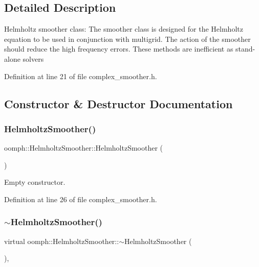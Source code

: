 \subsection{Detailed Description}
Helmholtz smoother class\+: The smoother class is designed for the Helmholtz equation to be used in conjunction with multigrid. The action of the smoother should reduce the high frequency errors. These methods are inefficient as stand-\/alone solvers 

Definition at line 21 of file complex\+\_\+smoother.\+h.



\subsection{Constructor \& Destructor Documentation}
\mbox{\label{classoomph_1_1HelmholtzSmoother_a7d220faf3d4834550ed0bc42f077c303}} 
\subsubsection{\texorpdfstring{Helmholtz\+Smoother()}{HelmholtzSmoother()}}
{\footnotesize\ttfamily oomph\+::\+Helmholtz\+Smoother\+::\+Helmholtz\+Smoother (\begin{DoxyParamCaption}{ }\end{DoxyParamCaption})\hspace{0.3cm}{\ttfamily [inline]}}



Empty constructor. 



Definition at line 26 of file complex\+\_\+smoother.\+h.

\mbox{\label{classoomph_1_1HelmholtzSmoother_ac83116186f1a5beffab8faa299b8d4f1}} 
\subsubsection{\texorpdfstring{$\sim$\+Helmholtz\+Smoother()}{~HelmholtzSmoother()}}
{\footnotesize\ttfamily virtual oomph\+::\+Helmholtz\+Smoother\+::$\sim$\+Helmholtz\+Smoother (\begin{DoxyParamCaption}{ }\end{DoxyParamCaption})\hspace{0.3cm}{\ttfamily [inline]}, {\ttfamily [virtual]}}



